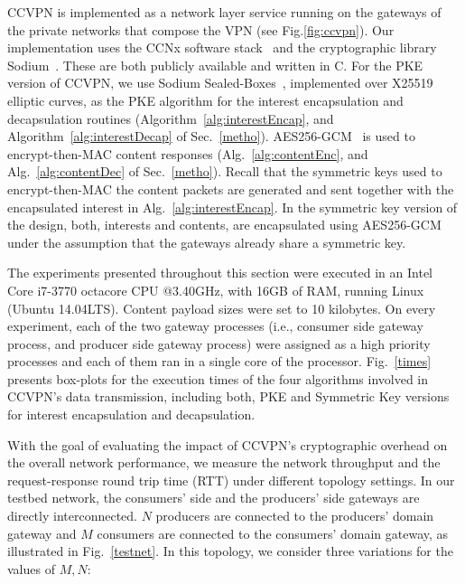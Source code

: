 CCVPN is implemented as a network layer service running on the gateways of the private
networks that compose the VPN (see Fig.\ref{fig:ccvpn}). Our implementation uses the CCNx
software stack~\cite{CCNxGithub} and the cryptographic library Sodium~\cite{sodiumGithub}.
These are both publicly available and written in C. For the PKE version of CCVPN, we use
Sodium Sealed-Boxes~\cite{bernstein2006curve25519}, implemented over X25519 elliptic curves,
as the PKE algorithm for the interest encapsulation and decapsulation routines
(Algorithm~\ref{alg:interestEncap}, and Algorithm~\ref{alg:interestDecap} of Sec.~\ref{metho}).
AES256-GCM~\cite{dworkin2007recommendation} is used to encrypt-then-MAC content
responses (Alg.~\ref{alg:contentEnc}, and Alg.~\ref{alg:contentDec} of Sec.~\ref{metho}).
Recall that the symmetric keys used to encrypt-then-MAC the content packets are
generated and sent together with the encapsulated interest in Alg.~\ref{alg:interestEncap}.
In the symmetric key version of the design, both, interests and contents, are
encapsulated using AES256-GCM under the assumption that the gateways already share a symmetric key.

The experiments presented throughout this section were executed in an Intel
Core i7-3770 octacore CPU @3.40GHz, with 16GB of RAM, running Linux (Ubuntu 14.04LTS).
Content payload sizes were set to 10 kilobytes. On every experiment, each of the two
gateway processes (i.e., consumer side gateway process, and producer side gateway process)
were assigned as a high priority processes and each of them ran in a single core of the processor.
Fig.~\ref{times} presents box-plots for the execution times of the four algorithms
involved in CCVPN's data transmission, including both, PKE and Symmetric Key versions
for interest encapsulation and decapsulation.

With the goal of evaluating the impact of CCVPN's cryptographic overhead on the
overall network performance, we measure the network throughput and the
request-response round trip time (RTT) under different topology settings.
In our testbed network, the consumers' side and the producers' side gateways are
directly interconnected. $N$ producers are connected to the producers' domain gateway
and $M$ consumers are connected to the consumers' domain gateway, as illustrated in Fig.~\ref{testnet}.
In this topology, we consider three variations for the values of ${M,N}$:

